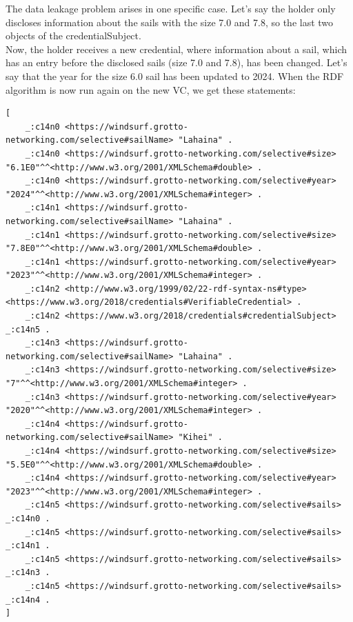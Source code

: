 \documentclass[
	a4paper               %
	,BCOR=0mm            %
	,bibliography=totoc   %
	,listof=totoc         %
	,monolingual
	,twoside=false
]{bfhthesis}              %
\begin{document}
The data leakage problem arises in one specific case.
Let's say the holder only discloses information about the sails with the size 7.0 and 7.8, so the last two objects of the credentialSubject.\\


Now, the holder receives a new credential, where information about a sail, which has an entry before the disclosed sails (size 7.0 and 7.8), has been changed.
Let's say that the year for the size 6.0 sail has been updated to 2024.
When the RDF algorithm is now run again on the new VC, we get these statements:
\newpage
\begin{lstlisting}[language=canon,firstnumber=1,caption={Example: Updated sails VC as statements},captionpos=b]
[
	_:c14n0 <https://windsurf.grotto-networking.com/selective#sailName> "Lahaina" .
	_:c14n0 <https://windsurf.grotto-networking.com/selective#size> "6.1E0"^^<http://www.w3.org/2001/XMLSchema#double> .
	_:c14n0 <https://windsurf.grotto-networking.com/selective#year> "2024"^^<http://www.w3.org/2001/XMLSchema#integer> .
	_:c14n1 <https://windsurf.grotto-networking.com/selective#sailName> "Lahaina" .
	_:c14n1 <https://windsurf.grotto-networking.com/selective#size> "7.8E0"^^<http://www.w3.org/2001/XMLSchema#double> .
	_:c14n1 <https://windsurf.grotto-networking.com/selective#year> "2023"^^<http://www.w3.org/2001/XMLSchema#integer> .
	_:c14n2 <http://www.w3.org/1999/02/22-rdf-syntax-ns#type> <https://www.w3.org/2018/credentials#VerifiableCredential> .
	_:c14n2 <https://www.w3.org/2018/credentials#credentialSubject> _:c14n5 .
	_:c14n3 <https://windsurf.grotto-networking.com/selective#sailName> "Lahaina" .
	_:c14n3 <https://windsurf.grotto-networking.com/selective#size> "7"^^<http://www.w3.org/2001/XMLSchema#integer> .
	_:c14n3 <https://windsurf.grotto-networking.com/selective#year> "2020"^^<http://www.w3.org/2001/XMLSchema#integer> .
	_:c14n4 <https://windsurf.grotto-networking.com/selective#sailName> "Kihei" .
	_:c14n4 <https://windsurf.grotto-networking.com/selective#size> "5.5E0"^^<http://www.w3.org/2001/XMLSchema#double> .
	_:c14n4 <https://windsurf.grotto-networking.com/selective#year> "2023"^^<http://www.w3.org/2001/XMLSchema#integer> .
	_:c14n5 <https://windsurf.grotto-networking.com/selective#sails> _:c14n0 .
	_:c14n5 <https://windsurf.grotto-networking.com/selective#sails> _:c14n1 .
	_:c14n5 <https://windsurf.grotto-networking.com/selective#sails> _:c14n3 .
	_:c14n5 <https://windsurf.grotto-networking.com/selective#sails> _:c14n4 .
]
\end{lstlisting}
\end{document}
